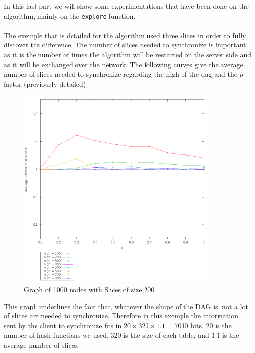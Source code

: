 In this last part we will show some experimentations that have been done on the algorithm, mainly on the \texttt{explore} function.
\paragraph{} The exemple that is detailed for the algorithm used three slices in order to fully discover the difference. The number of slices needed to synchronize is important as it is the number of times the algorithm will be restarted on the server side and as it will be exchanged over the network. The following curves give the average number of slices needed to synchronize regarding the high of the dag and the $p$ factor (previously detailed)
 \begin{figure}[H]
 \centering
  \includegraphics[height=10cm]{./image/slicesent/Nb_sent_slice.png}
  \caption{Graph of 1000 nodes with Slices of size 200}
 \end{figure}
 This graph underlines the fact that, whatever the shape of the DAG is, not a lot of slices are needed to synchronize. Therefore in this exemple the information sent by the client to synchronize fits in $20\times 320 \times 1.1 = 7040$ bits. $20$ is the number of hash functions we used, $320$ is the size of each table, and $1.1$ is the average number of slices.
 
